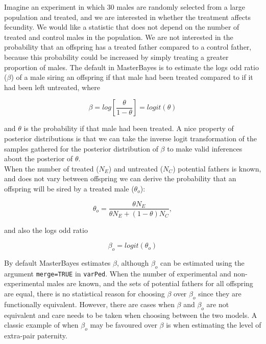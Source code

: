 \documentclass{article}
\begin{document}
Imagine an experiment in which 30 males are randomly selected from a large population and treated, and we are interested in whether the treatment affects fecundity.  We would like a statistic that does not depend on the number of treated and control males in the population.  We are not interested in the probability that an offspring has a treated father compared to a control father, because this probability could be increased by simply treating a greater proportion of males.  The default in MasterBayes is to estimate the logs odd ratio ($\beta$) of a male siring an offspring if that male had been treated compared to if it had been left untreated, where

\begin{equation}
\beta  = log\left[\frac{\theta}{1-\theta}\right] = logit(\theta)
\end{equation}

and $\theta$ is the probability if that male had been treated. A nice property of posterior distributions is that we can take the inverse logit transformation of the samples gathered for the posterior distribution of $\beta$ to make valid inferences about the posterior of $\theta$.\\

When the number of treated ($N_{E}$) and untreated ($N_{C}$) potential fathers is known, and does not vary between offspring we can derive the probability that an offspring will be sired by a treated male ($\theta_{o}$):

\begin{equation}
\theta_{o}  = \frac{\theta N_{E}}{\theta N_{E} + (1-\theta)N_{C}},  
\label{eq_thetao}
\end{equation}

and also the logs odd ratio

\begin{equation}
\beta_{o}  = logit(\theta_{o})
\end{equation}

By default MasterBayes estimates $\beta$, although $\beta_{o}$ can be estimated using the argument \texttt{merge=TRUE} in \texttt{varPed}.  When the number of experimental and non-experimental males are known, and the sets of potential fathers for all offspring are equal, there is no statistical reason for choosing $\beta$ over $\beta_{o}$ since they are functionally equivalent.  However, there are cases when $\beta$ and $\beta_{o}$ are not equivalent and care needs to be taken when choosing between the two models.  A classic example of when  $\beta_{o}$ may be favoured over $\beta$ is when estimating the level of extra-pair paternity.
 
\end{document}
